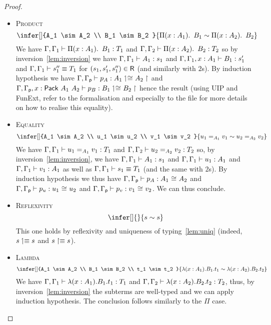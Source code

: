 \begin{proof}
\begin{itemize}
    \item \textsc{Product}
    \[
      \infer[]
        {A_1 \sim A_2 \\
         B_1 \sim B_2
        }
        {\Prod{x:A_1} B_1 \sim \Prod{x:A_2} B_2}
    \]
    We have $\isterm{\Ga, \Ga_1}{\Prod{x:A_1} B_1}{T_1}$ and
    $\isterm{\Ga, \Ga_2}{\Prod{x:A_2} B_2}{T_2}$ so by
    inversion~\eqref{lem:inversion} we have $\isterm{\Ga, \Ga_1}{A_1}{s_1}$ and
    $\isterm{\Ga, \Ga_1, x:A_1}{B_1}{s'_1}$ and
    $\eqtype{\Ga, \Ga_1}{s''_1}{T_1}$ for $(s_1,s'_1,s''_1) \in \Rl$
    (and similarly with $2$s).
    By induction hypothesis we have
    $\isterm{\Ga, \Gp}{p_A}{\Heq{}{\lo{A_1}}{}{\ro{A_2}}}$ and
    $\isterm
      {\Ga, \Gp, x : \Pack{A_1}{A_2}}
      {p_B}
      {\Heq{}{\lo{B_1}}{}{\ro{B_2}}}
    $
    hence the result (using UIP and FunExt, refer to the
    formalisation and especially to the file  for more details
    on how to realise this equality).

    \item \textsc{Equality}
    \[
      \infer[]
        {A_1 \sim A_2 \\
         u_1 \sim u_2 \\
         v_1 \sim v_2
        }
        {\Eq{A_1}{u_1}{v_1} \sim \Eq{A_2}{u_2}{v_2}}
    \]
    We have $\isterm{\Ga, \Ga_1}{\Eq{A_1}{u_1}{v_1}}{T_1}$ and
    $\isterm{\Ga, \Ga_2}{\Eq{A_2}{u_2}{v_2}}{T_2}$ so, by
    inversion~\eqref{lem:inversion}, we have
    $\isterm{\Ga, \Ga_1}{A_1}{s_1}$ and $\isterm{\Ga, \Ga_1}{u_1}{A_1}$ and
    $\isterm{\Ga, \Ga_1}{v_1}{A_1}$ as well as $\eqtype{\Ga, \Ga_1}{s_1}{T_1}$
    (and the same with $2$s). By induction hypothesis we thus have
    $\isterm{\Ga, \Gp}{p_{A}}{\Heq{}{A_1}{}{A_2}}$ and
    $\isterm{\Ga, \Gp}{p_u}{\Heq{}{u_1}{}{u_2}}$ and
    $\isterm{\Ga, \Gp}{p_v}{\Heq{}{v_1}{}{v_2}}$.
    We can thus conclude.

    \item \textsc{Reflexivity}
    \[
      \infer[]
        { }
        {s \sim s}
    \]
    This one holds by reflexivity and uniqueness of typing~\eqref{lem:uniq}
    (indeed, $\lo{s} \equiv s$ and $\ro{s} \equiv s$).

    \item \textsc{Lambda}
    \[
      \infer[]
        {A_1 \sim A_2 \\
         B_1 \sim B_2 \\
         t_1 \sim t_2
        }
        {\lam{x:A_1}{B_1} t_1 \sim \lam{x:A_2}{B_2} t_2}
    \]
    We have $\isterm{\Ga, \Ga_1}{\lam{x:A_1}{B_1} t_1}{T_1}$ and
    $\isterm{\Ga, \Ga_2}{\lam{x:A_2}{B_2} t_2}{T_2}$, thus, by
    inversion~\ref{lem:inversion} the subterms are well-typed and we can
    apply induction hypothesis. The conclusion follows similarly to the $\Pi$
    case.


\end{itemize}
\end{proof}
